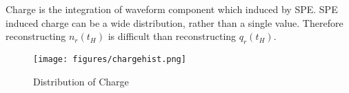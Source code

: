 Charge is the integration of waveform component which induced by SPE. SPE induced charge can be a wide distribution, rather than a single value. Therefore reconstructing $n_{r}(t_{H})$ is difficult than reconstructing $q_{r}(t_{H})$. 

\begin{figure}[H]
    \centering
    \texttt{[image: figures/chargehist.png]}
    \caption{\label{fig:charge} Distribution of Charge}
\end{figure}


